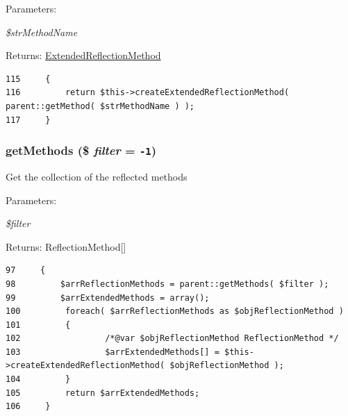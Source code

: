\begin{Desc}
\item[Parameters:]
\begin{description}
\item[{\em \$strMethodName}]\end{description}
\end{Desc}
\begin{Desc}
\item[Returns:]\hyperlink{class_extended_reflection_method}{ExtendedReflectionMethod} \end{Desc}


\begin{Code}\begin{verbatim}115     {
116         return $this->createExtendedReflectionMethod( parent::getMethod( $strMethodName ) );
117     }
\end{verbatim}
\end{Code}


\hypertarget{class_extended_reflection_class_c747edd613c23881113d99316f12812d}{
\subsubsection[{getMethods}]{\setlength{\rightskip}{0pt plus 5cm}getMethods (\$ {\em filter} = {\tt -1})}}
\label{class_extended_reflection_class_c747edd613c23881113d99316f12812d}


Get the collection of the reflected methods

\begin{Desc}
\item[Parameters:]
\begin{description}
\item[{\em \$filter}]\end{description}
\end{Desc}
\begin{Desc}
\item[Returns:]ReflectionMethod\mbox{[}\mbox{]} \end{Desc}


\begin{Code}\begin{verbatim}97     {
98         $arrReflectionMethods = parent::getMethods( $filter );
99         $arrExtendedMethods = array();
100         foreach( $arrReflectionMethods as $objReflectionMethod )
101         {
102                 /*@var $objReflectionMethod ReflectionMethod */
103                 $arrExtendedMethods[] = $this->createExtendedReflectionMethod( $objReflectionMethod );
104         }
105         return $arrExtendedMethods;
106     }
\end{verbatim}
\end{Code}


